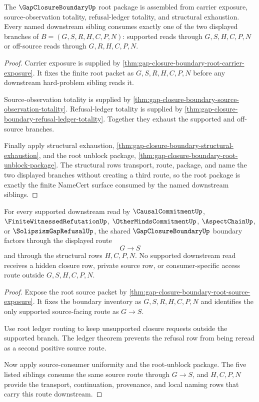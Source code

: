 \begin{theorem}
\label{thm:gap-closure-boundary-namecert-root-package}
The $\GapClosureBoundaryUp$ root package is assembled from carrier exposure, source-observation totality, refusal-ledger totality, and structural exhaustion. Every named downstream sibling consumes exactly one of the two displayed branches of $B=(G,S,R,H,C,P,N)$: supported reads through $G,S,H,C,P,N$ or off-source reads through $G,R,H,C,P,N$.
\end{theorem}
\begin{proof}
Carrier exposure is supplied by \autoref{thm:gap-closure-boundary-root-carrier-exposure}. It fixes the finite root packet as $G,S,R,H,C,P,N$ before any downstream hard-problem sibling reads it.

Source-observation totality is supplied by \autoref{thm:gap-closure-boundary-source-observation-totality}. Refusal-ledger totality is supplied by \autoref{thm:gap-closure-boundary-refusal-ledger-totality}. Together they exhaust the supported and off-source branches.

Finally apply structural exhaustion, \autoref{thm:gap-closure-boundary-structural-exhaustion}, and the root unblock package, \autoref{thm:gap-closure-boundary-root-unblock-package}. The structural rows transport, route, package, and name the two displayed branches without creating a third route, so the root package is exactly the finite NameCert surface consumed by the named downstream siblings.
\end{proof}

\begin{theorem}
\label{thm:gap-closure-boundary-downstream-source-route-package}
For every supported downstream read by $\CausalCommitmentUp$, $\FiniteWitnessedRefutationUp$, $\OtherMindsCommitmentUp$, $\AspectChainUp$, or $\SolipsismGapRefusalUp$, the shared $\GapClosureBoundaryUp$ boundary factors through the displayed route
$$
G \longrightarrow S
$$
and through the structural rows $H,C,P,N$. No supported downstream read receives a hidden closure row, private source row, or consumer-specific access route outside $G,S,H,C,P,N$.
\end{theorem}
\begin{proof}
Expose the root source packet by \autoref{thm:gap-closure-boundary-root-source-exposure}. It fixes the boundary inventory as $G,S,R,H,C,P,N$ and identifies the only supported source-facing route as $G \longrightarrow S$.

Use root ledger routing to keep unsupported closure requests outside the supported branch. The ledger theorem prevents the refusal row from being reread as a second positive source route.

Now apply source-consumer uniformity and the root-unblock package. The five listed siblings consume the same source route through $G \longrightarrow S$, and $H,C,P,N$ provide the transport, continuation, provenance, and local naming rows that carry this route downstream.
\end{proof}


